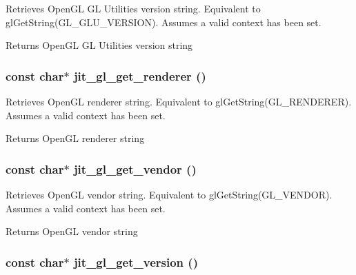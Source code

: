 Retrieves OpenGL GL Utilities version string. Equivalent to glGetString(GL\_\-GLU\_\-VERSION). Assumes a valid context has been set.

\begin{DoxyReturn}{Returns}
OpenGL GL Utilities version string 
\end{DoxyReturn}
\hypertarget{group__ob3dmod_ga0a828499dc5e04fa6cbaaa0dce08ad16}{
\subsubsection[{jit\_\-gl\_\-get\_\-renderer}]{\setlength{\rightskip}{0pt plus 5cm}const char$\ast$ jit\_\-gl\_\-get\_\-renderer ()}}
\label{group__ob3dmod_ga0a828499dc5e04fa6cbaaa0dce08ad16}


Retrieves OpenGL renderer string. Equivalent to glGetString(GL\_\-RENDERER). Assumes a valid context has been set.

\begin{DoxyReturn}{Returns}
OpenGL renderer string 
\end{DoxyReturn}
\hypertarget{group__ob3dmod_gafb99f462a0bd84c178284a8729facbc8}{
\subsubsection[{jit\_\-gl\_\-get\_\-vendor}]{\setlength{\rightskip}{0pt plus 5cm}const char$\ast$ jit\_\-gl\_\-get\_\-vendor ()}}
\label{group__ob3dmod_gafb99f462a0bd84c178284a8729facbc8}


Retrieves OpenGL vendor string. Equivalent to glGetString(GL\_\-VENDOR). Assumes a valid context has been set.

\begin{DoxyReturn}{Returns}
OpenGL vendor string 
\end{DoxyReturn}
\hypertarget{group__ob3dmod_gae2015d77352f442de5f37b6f6e56ac25}{
\subsubsection[{jit\_\-gl\_\-get\_\-version}]{\setlength{\rightskip}{0pt plus 5cm}const char$\ast$ jit\_\-gl\_\-get\_\-version ()}}
\label{group__ob3dmod_gae2015d77352f442de5f37b6f6e56ac25}



